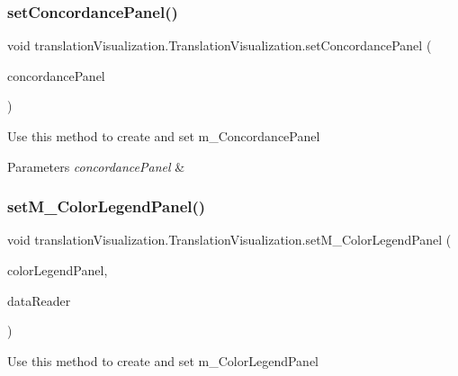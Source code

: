 \subsubsection{\texorpdfstring{set\+Concordance\+Panel()}{setConcordancePanel()}}
{\footnotesize\ttfamily void translation\+Visualization.\+Translation\+Visualization.\+set\+Concordance\+Panel (\begin{DoxyParamCaption}\item[{Concordance\+Panel}]{concordance\+Panel }\end{DoxyParamCaption})\hspace{0.3cm}{\ttfamily [inline]}}

Use this method to create and set m\+\_\+\+Concordance\+Panel


\begin{DoxyParams}{Parameters}
{\em concordance\+Panel} & \\
\hline
\end{DoxyParams}
\mbox{\label{classtranslation_visualization_1_1_translation_visualization_aa101a9495f44afc16f938cf13a6f2e24}} 
\subsubsection{\texorpdfstring{set\+M\+\_\+\+Color\+Legend\+Panel()}{setM\_ColorLegendPanel()}}
{\footnotesize\ttfamily void translation\+Visualization.\+Translation\+Visualization.\+set\+M\+\_\+\+Color\+Legend\+Panel (\begin{DoxyParamCaption}\item[{Color\+Legend\+Panel}]{color\+Legend\+Panel,  }\item[{\hyperlink{classtranslation_visualization_1_1_data_reader}{Data\+Reader}}]{data\+Reader }\end{DoxyParamCaption})\hspace{0.3cm}{\ttfamily [inline]}}

Use this method to create and set m\+\_\+\+Color\+Legend\+Panel


